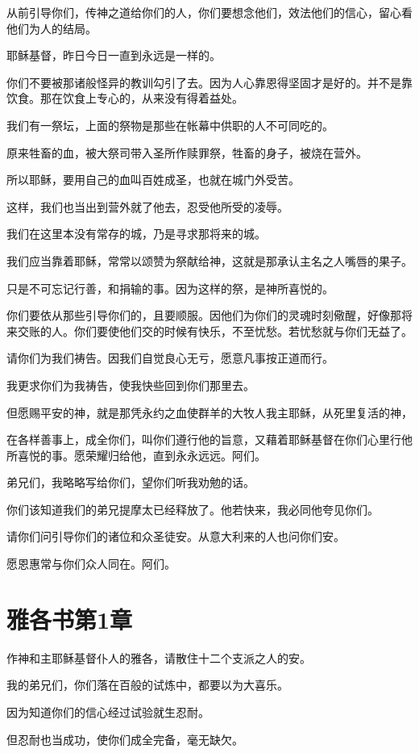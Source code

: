\documentclass[12pt,oneside]{book}
\begin{document}
从前引导你们，传神之道给你们的人，你们要想念他们，效法他们的信心，留心看他们为人的结局。

耶稣基督，昨日今日一直到永远是一样的。

你们不要被那诸般怪异的教训勾引了去。因为人心靠恩得坚固才是好的。并不是靠饮食。那在饮食上专心的，从来没有得着益处。

我们有一祭坛，上面的祭物是那些在帐幕中供职的人不可同吃的。

原来牲畜的血，被大祭司带入圣所作赎罪祭，牲畜的身子，被烧在营外。

所以耶稣，要用自己的血叫百姓成圣，也就在城门外受苦。

这样，我们也当出到营外就了他去，忍受他所受的凌辱。

我们在这里本没有常存的城，乃是寻求那将来的城。

我们应当靠着耶稣，常常以颂赞为祭献给神，这就是那承认主名之人嘴唇的果子。

只是不可忘记行善，和捐输的事。因为这样的祭，是神所喜悦的。

你们要依从那些引导你们的，且要顺服。因他们为你们的灵魂时刻儆醒，好像那将来交账的人。你们要使他们交的时候有快乐，不至忧愁。若忧愁就与你们无益了。

请你们为我们祷告。因我们自觉良心无亏，愿意凡事按正道而行。

我更求你们为我祷告，使我快些回到你们那里去。

但愿赐平安的神，就是那凭永约之血使群羊的大牧人我主耶稣，从死里复活的神，

在各样善事上，成全你们，叫你们遵行他的旨意，又藉着耶稣基督在你们心里行他所喜悦的事。愿荣耀归给他，直到永永远远。阿们。

弟兄们，我略略写给你们，望你们听我劝勉的话。

你们该知道我们的弟兄提摩太已经释放了。他若快来，我必同他夸见你们。

请你们问引导你们的诸位和众圣徒安。从意大利来的人也问你们安。

愿恩惠常与你们众人同在。阿们。

\chapter{雅各书第1章}
作神和主耶稣基督仆人的雅各，请散住十二个支派之人的安。

我的弟兄们，你们落在百般的试炼中，都要以为大喜乐。

因为知道你们的信心经过试验就生忍耐。

但忍耐也当成功，使你们成全完备，毫无缺欠。
\end{document}
